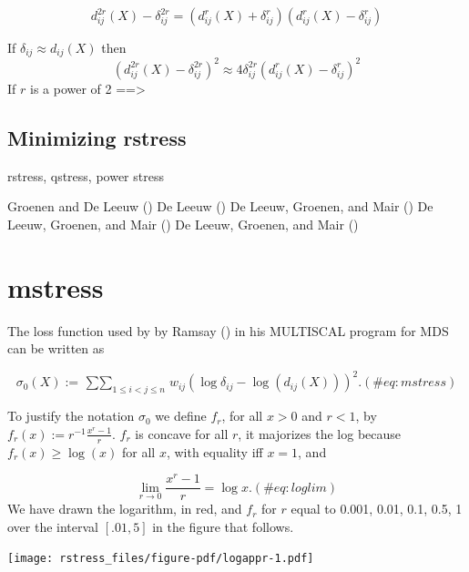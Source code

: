 \documentclass[
  12pt,
  letterpaper,
  DIV=11,
  numbers=noendperiod]{scrreprt}
\theoremstyle{remark}
\begin{document}
\[
d_{ij}^{2r}(X)-\delta_{ij}^{2r}=
(d_{ij}^{r}(X)+\delta_{ij}^{r})(d_{ij}^{r}(X)-\delta_{ij}^{r})
\]

If \(\delta_{ij}\approx d_{ij}(X)\) then \[
(d_{ij}^{2r}(X)-\delta_{ij}^{2r})^2\approx 4\delta_{ij}^{2r}(d_{ij}^{r}(X)-\delta_{ij}^{r})^2
\] If \(r\) is a power of 2 ==\textgreater{}

\subsection{Minimizing rstress}\label{minimizing-rstress}

rstress, qstress, power stress

Groenen and De Leeuw () De
Leeuw () De Leeuw, Groenen, and Mair
() De Leeuw, Groenen,
and Mair () De Leeuw,
Groenen, and Mair ()

\section{mstress}\label{mstress}

The loss function used by by Ramsay () in
his MULTISCAL program for MDS can be written as

\begin{equation}
\sigma_0(X):=\mathop{\sum\sum}_{1\leq i<j\leq n}w_{ij}(\log\delta_{ij}-\log(d_{ij}(X)))^2.
(\#eq:mstress)
\end{equation}

To justify the notation \(\sigma_0\) we define \(f_r\), for all \(x>0\)
and \(r<1\), by \(f_r(x):=r^{-1}\frac{x^r-1}{r}\). \(f_r\) is concave
for all \(r\), it majorizes the log because \(f_r(x)\geq\log(x)\) for
all \(x\), with equality iff \(x=1\), and

\begin{equation}
\lim_{r\rightarrow 0}\frac{x^r-1}{r}=\log x.
(\#eq:loglim)
\end{equation} We have drawn the logarithm, in red, and \(f_r\) for
\(r\) equal to 0.001, 0.01, 0.1, 0.5, 1 over the interval \([.01,5]\) in
the figure that follows.

\begin{center}
\texttt{[image: rstress\_files/figure-pdf/logappr-1.pdf]}
\end{center}
\end{document}

